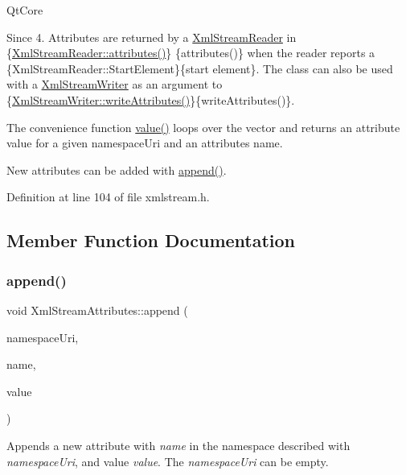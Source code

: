Qt\+Core \begin{DoxySince}{Since}
4.  Attributes are returned by a \hyperlink{class_xml_stream_reader}{Xml\+Stream\+Reader} in \{\hyperlink{class_xml_stream_reader_aaa89a6baad93837857847a3ec5d7710a}{Xml\+Stream\+Reader\+::attributes()}\} \{attributes()\} when the reader reports a  \{Xml\+Stream\+Reader\+::\+Start\+Element\}\{start element\}. The class can also be used with a \hyperlink{class_xml_stream_writer}{Xml\+Stream\+Writer} as an argument to  \{\hyperlink{class_xml_stream_writer_a401845495b28fcc27a7f491ac402ea47}{Xml\+Stream\+Writer\+::write\+Attributes()}\}\{write\+Attributes()\}.
\end{DoxySince}
The convenience function \hyperlink{class_xml_stream_attributes_ac13c28528742b32ef4c4684f8c39941b}{value()} loops over the vector and returns an attribute value for a given namespace\+Uri and an attribute\textquotesingle{}s name.

New attributes can be added with \hyperlink{class_xml_stream_attributes_a51a667e3daddcea19ec85d51f0da6d6b}{append()}. 

Definition at line 104 of file xmlstream.\+h.



\subsection{Member Function Documentation}
\mbox{\label{class_xml_stream_attributes_a51a667e3daddcea19ec85d51f0da6d6b}} 
\subsubsection{\texorpdfstring{append()}{append()}\hspace{0.1cm}{\footnotesize\ttfamily [1/2]}}
{\footnotesize\ttfamily void Xml\+Stream\+Attributes\+::append (\begin{DoxyParamCaption}\item[{const Q\+String \&}]{namespace\+Uri,  }\item[{const Q\+String \&}]{name,  }\item[{const Q\+String \&}]{value }\end{DoxyParamCaption})}

Appends a new attribute with {\itshape name} in the namespace described with {\itshape namespace\+Uri}, and value {\itshape value}. The {\itshape namespace\+Uri} can be empty. 

